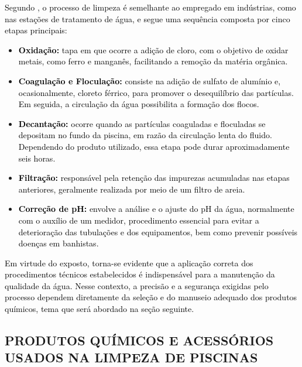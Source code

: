         \textcolor{black}{Segundo \cite{tccSilva}, o processo de limpeza é semelhante ao empregado em indústrias, como nas estações de tratamento de água, e segue uma sequência composta por cinco etapas principais:}

        \begin{itemize}
            \item \textbf{\textcolor{black}{Oxidação:}} \textcolor{black}{tapa em que ocorre a adição de cloro, com o objetivo de oxidar metais, como ferro e manganês, facilitando a remoção da matéria orgânica.}
            
            \item \textbf{\textcolor{black}{Coagulação e Floculação:}} \textcolor{black}{consiste na adição de sulfato de alumínio e, ocasionalmente, cloreto férrico, para promover o desequilíbrio das partículas. Em seguida, a circulação da água possibilita a formação dos flocos.}
             
            \item \textbf{\textcolor{black}{Decantação:}} \textcolor{black}{ocorre quando as partículas coaguladas e floculadas se depositam no fundo da piscina, em razão da circulação lenta do fluido. Dependendo do produto utilizado, essa etapa pode durar aproximadamente seis horas.}

            \item \textbf{\textcolor{black}{Filtração:}} \textcolor{black}{responsável pela retenção das impurezas acumuladas nas etapas anteriores, geralmente realizada por meio de um filtro de areia.}

            \item \textbf{\textcolor{black}{Correção de pH:}} \textcolor{black}{envolve a análise e o ajuste do pH da água, normalmente com o auxílio de um medidor, procedimento essencial para evitar a deterioração das tubulações e dos equipamentos, bem como prevenir possíveis doenças em banhistas.}
            
        \end{itemize}

        \textcolor{black}{Em virtude do exposto, torna-se evidente que a aplicação correta dos procedimentos técnicos estabelecidos é indispensável para a manutenção da qualidade da água. Nesse contexto, a precisão e a segurança exigidas pelo processo dependem diretamente da seleção e do manuseio adequado dos produtos químicos, tema que será abordado na seção seguinte.}


    \subsection{PRODUTOS QUÍMICOS E ACESSÓRIOS USADOS NA LIMPEZA DE PISCINAS}

